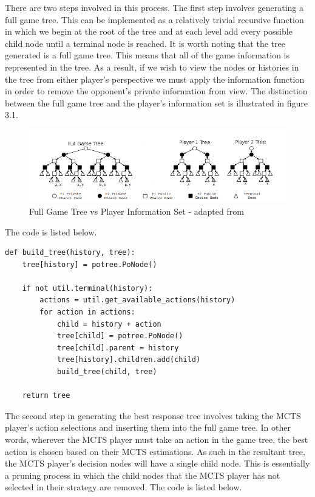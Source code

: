 There are two steps involved in this process.
The first step involves generating a full game tree.
This can be implemented as a relatively trivial recursive function in which we begin at the root of the
tree and at each level add every possible child node until a terminal node is reached.
It is worth noting that the tree generated is a full game tree.
This means that all of the game information is represented in the tree.
As a result, if we wish to view the nodes or histories in the tree from either player's perspective we must apply
the information function in order to remove the opponent's private information from view.
The distinction between the full game tree and the player's information set is illustrated
in figure 3.1.

\begin{figure}[!ht]
    \includegraphics[scale=.6]{images/separate_game_trees_johanson.png}
    \caption{Full Game Tree vs Player Information Set - adapted from\citep{johanson2011accelerating}}
\end{figure}

The code is listed below.

\begin{lstlisting}[style=Python]
def build_tree(history, tree):
    tree[history] = potree.PoNode()

    if not util.terminal(history):
        actions = util.get_available_actions(history)
        for action in actions:
            child = history + action
            tree[child] = potree.PoNode()
            tree[child].parent = history
            tree[history].children.add(child)
            build_tree(child, tree)

    return tree
\end{lstlisting}

The second step in generating the best response tree involves taking the MCTS player's action
selections and inserting them into the full game tree\citep{heinrich2017reinforcement}.
In other words, wherever the MCTS player must take an action in the game tree, the best action is chosen
based on their MCTS estimations.
As such in the resultant tree, the MCTS player's decision nodes will have
a single child node.
This is essentially a pruning process in which the child nodes that the MCTS player has
not selected in their strategy are removed.
The code is listed below.

